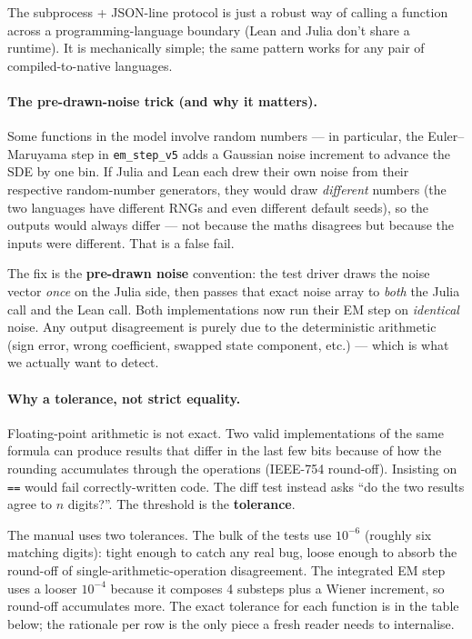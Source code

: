\documentclass[11pt,a4paper]{article}
\begin{document}
The subprocess + JSON-line protocol is just a robust way of
calling a function across a programming-language boundary
(Lean and Julia don't share a runtime). It is mechanically simple;
the same pattern works for any pair of compiled-to-native
languages.

\paragraph{The pre-drawn-noise trick (and why it matters).} Some
functions in the model involve random numbers --- in particular,
the Euler--Maruyama step in \texttt{em\_step\_v5} adds a Gaussian
noise increment to advance the SDE by one bin. If Julia and Lean
each drew their own noise from their respective random-number
generators, they would draw \emph{different} numbers (the two
languages have different RNGs and even different default seeds),
so the outputs would always differ --- not because the maths
disagrees but because the inputs were different. That is a false
fail.

The fix is the \textbf{pre-drawn noise} convention: the test
driver draws the noise vector \emph{once} on the Julia side, then
passes that exact noise array to \emph{both} the Julia call and
the Lean call. Both implementations now run their EM step on
\emph{identical} noise. Any output disagreement is purely due to
the deterministic arithmetic (sign error, wrong coefficient,
swapped state component, etc.) --- which is what we actually want
to detect.

\paragraph{Why a tolerance, not strict equality.} Floating-point
arithmetic is not exact. Two valid implementations of the same
formula can produce results that differ in the last few bits
because of how the rounding accumulates through the operations
(IEEE-754 round-off). Insisting on \texttt{==} would fail
correctly-written code. The diff test instead asks ``do the two
results agree to $n$ digits?''. The threshold is the
\textbf{tolerance}.

The manual uses two tolerances. The bulk of the tests use $10^{-6}$
(roughly six matching digits): tight enough to catch any real bug,
loose enough to absorb the round-off of single-arithmetic-operation
disagreement. The integrated EM step uses a looser $10^{-4}$
because it composes 4 substeps plus a Wiener increment, so
round-off accumulates more. The exact tolerance for each function
is in the table below; the rationale per row is the only piece a
fresh reader needs to internalise.
\end{document}
